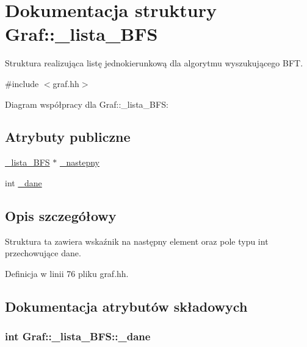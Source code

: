 \hypertarget{struct_graf_1_1__lista___b_f_s}{\section{\-Dokumentacja struktury \-Graf\-:\-:\-\_\-lista\-\_\-\-B\-F\-S}
\label{struct_graf_1_1__lista___b_f_s}
}


\-Struktura realizująca listę jednokierunkową dla algorytmu wyszukującego \-B\-F\-T.  




{\ttfamily \#include $<$graf.\-hh$>$}



\-Diagram współpracy dla \-Graf\-:\-:\-\_\-lista\-\_\-\-B\-F\-S\-:
\subsection*{\-Atrybuty publiczne}
\begin{DoxyCompactItemize}
\item 
\hyperlink{struct_graf_1_1__lista___b_f_s}{\-\_\-lista\-\_\-\-B\-F\-S} $\ast$ \hyperlink{struct_graf_1_1__lista___b_f_s_ad101a4841ac1d7c783fc24c4ef6790c1}{\-\_\-nastepny}
\item 
int \hyperlink{struct_graf_1_1__lista___b_f_s_a35804941f3d4d18c8afc8867e2204085}{\-\_\-dane}
\end{DoxyCompactItemize}


\subsection{\-Opis szczegółowy}
\-Struktura ta zawiera wskaźnik na następny element oraz pole typu int przechowujące dane. 

\-Definicja w linii 76 pliku graf.\-hh.



\subsection{\-Dokumentacja atrybutów składowych}
\hypertarget{struct_graf_1_1__lista___b_f_s_a35804941f3d4d18c8afc8867e2204085}{
\subsubsection[{\-\_\-dane}]{\setlength{\rightskip}{0pt plus 5cm}int {\bf \-Graf\-::\-\_\-lista\-\_\-\-B\-F\-S\-::\-\_\-dane}}}\label{struct_graf_1_1__lista___b_f_s_a35804941f3d4d18c8afc8867e2204085}



